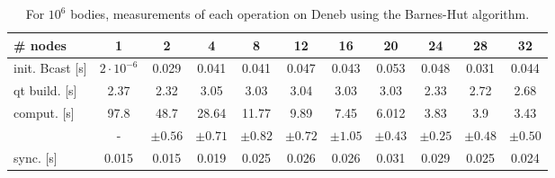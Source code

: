 \begin{table}[h]
  \begin{adjustwidth}{-1.5cm}{-1.5cm}   
\centering
\begin{tabular}{l|cccccccccc}
\# nodes & 1 & 2 & 4 & 8 & 12 & 16 & 20 & 24 & 28 & 32\\
\hline init. Bcast [s] & $2\cdot10^{-6}$ & 0.029 & 0.041 & 0.041 & 0.047 & 0.043 & 0.053 & 0.048 & 0.031 & 0.044\\
qt build. [s] & 2.37 & 2.32 & 3.05 & 3.03 & 3.04 & 3.03 & 3.03 & 2.33 & 2.72 & 2.68\\
comput. [s] & 97.8 & 48.7 & 28.64 & 11.77 & 9.89 & 7.45 & 6.012 & 3.83 & 3.9 & 3.43 \\
& - & $\pm 0.56$ & $\pm 0.71$ & $\pm 0.82$ & $\pm 0.72$ & $\pm 1.05$ & $\pm 0.43$ & $\pm 0.25$ & $\pm 0.48$ & $\pm 0.50$  \\
sync. [s] & 0.015 & 0.015 & 0.019 & 0.025 & 0.026 & 0.026 & 0.031 & 0.029 & 0.025 &0.024\\
\end{tabular}
\caption{For $10^6$ bodies, measurements of each operation on Deneb using the Barnes-Hut algorithm.}
\label{tab:qt:10e6}
  \end{adjustwidth}
\end{table}
\newpage
